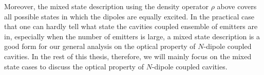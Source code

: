 
Moreover, the mixed state description using the density operator $\rho$ above covers all possible states in which the dipoles are equally excited.
In the practical case that one can hardly tell what state the cavities coupled ensemble of emitters are in, especially when the number of emitters is large, a mixed state description is a good form for our general analysis on the optical property of $N$-dipole coupled cavities.
In the rest of this thesis, therefore, we will mainly focus on the mixed state cases to discuss the optical property of $N$-dipole coupled cavities.


